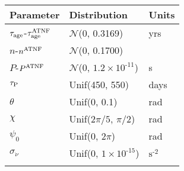 \begin{tabular}{lll} \hhline{===}
        Parameter & Distribution &  Units\\ \hline
$\tau_{\mathrm{age}}$\textrm{-}$\tau_{\mathrm{age}}^{\tiny\textrm{ATNF}}$
 & $\mathcal{N}$(0, 0.3169) & yrs\\
$n$\textrm{-}$n^{\tiny\textrm{ATNF}}$ & $\mathcal{N}$(0, 0.1700) & \\
$P$\textrm{-}$P^{\tiny\textrm{ATNF}}$
 & $\mathcal{N}$(0, ${1.2}\times 10^{\textrm{-}11}$) & s\\
$\tau_{\mathrm{P}}$ & Unif(450, 550) & days\\
$\theta$ & Unif(0, 0.1) & rad\\
$\chi$ & Unif($2\pi/5$, $\pi/2$) & rad\\
$\psi_0$ & Unif(0, $2\pi$) & rad\\
$\sigma_{\dot{\nu}}$ & Unif(0, ${1}\times 10^{\textrm{-}15}$) & $\mathrm{s}^{\textrm{-}2}$\\
\hhline{===}
\end{tabular}
